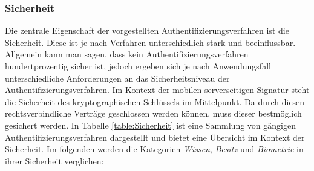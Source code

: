 \documentclass[11pt,a4paper,ngerman]{scrreprt}
\begin{document}
\subsubsection{Sicherheit}
Die zentrale Eigenschaft der vorgestellten Authentifizierungsverfahren ist die Sicherheit. Diese ist je nach Verfahren unterschiedlich stark und beeinflussbar. Allgemein kann man sagen, dass kein Authentifizierungsverfahren hundertprozentig sicher ist, jedoch ergeben sich je nach Anwendungsfall unterschiedliche Anforderungen an das Sicherheitsniveau der Authentifizierungsverfahren. Im Kontext der mobilen serverseitigen Signatur steht die Sicherheit des kryptographischen Schlüssels im Mittelpunkt. Da durch diesen rechtsverbindliche Verträge geschlossen werden können, muss dieser bestmöglich gesichert werden. In Tabelle \ref{table:Sicherheit} ist eine Sammlung von gängigen Authentifizierungsverfahren \cite{fido17} dargestellt und bietet eine Übersicht im Kontext der Sicherheit. Im folgenden werden die Kategorien \emph{Wissen}, \emph{Besitz} und \emph{Biometrie} in ihrer Sicherheit verglichen:
\end{document}
